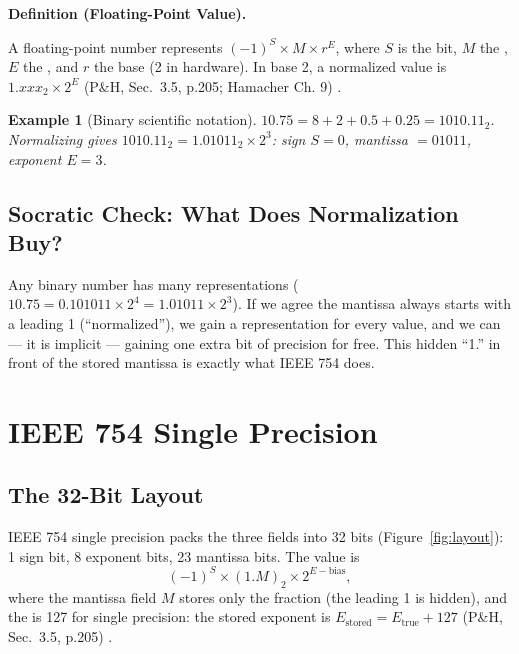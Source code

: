\documentclass[11pt]{article}
\newtheorem{example}{Example}[section]
\newenvironment{definitionbox}[1]{%
  \par\noindent\textbf{Definition (#1).}\ \itshape
}{\par\vspace{0.3em}}
\begin{document}
\begin{definitionbox}{Floating-Point Value}
A floating-point number represents $(-1)^S \times M \times r^E$, where $S$ is the  bit, $M$ the , $E$ the , and $r$ the base (2 in hardware). In base 2, a normalized value is $1.xxx_2 \times 2^E$ (P\&H, Sec.~3.5, p.205; Hamacher Ch. 9) \cite{PattersonHennessy2017_computer_organization_design,Hamacher2002_computer_organization}.
\end{definitionbox}

\begin{example}[Binary scientific notation]
$10.75 = 8 + 2 + 0.5 + 0.25 = 1010.11_2$. Normalizing gives $1010.11_2 = 1.01011_2 \times 2^3$: sign $S=0$, mantissa $= 01011$, exponent $E=3$.
\end{example}

\subsection{Socratic Check: What Does Normalization Buy?}

Any binary number has many representations ($10.75 = 0.101011 \times 2^4 = 1.01011 \times 2^3$). If we agree the mantissa always starts with a leading 1 (``normalized''), we gain a  representation for every value, and we can  --- it is implicit --- gaining one extra bit of precision for free. This hidden ``1.'' in front of the stored mantissa is exactly what IEEE 754 does.

\section{IEEE 754 Single Precision}
\label{sec:single}

\subsection{The 32-Bit Layout}

IEEE 754 single precision packs the three fields into 32 bits (Figure~\ref{fig:layout}): 1 sign bit, 8 exponent bits, 23 mantissa bits. The value is
\[
  (-1)^S \times (1.M)_2 \times 2^{E-\text{bias}},
\]
where the mantissa field $M$ stores only the fraction (the leading 1 is hidden), and the  is 127 for single precision: the stored exponent is $E_{\text{stored}} = E_{\text{true}} + 127$ (P\&H, Sec.~3.5, p.205) \cite{PattersonHennessy2017_computer_organization_design}.
\end{document}
